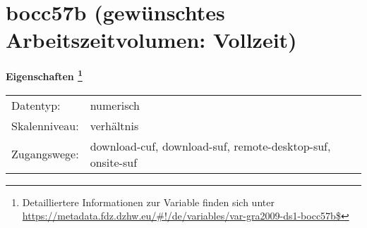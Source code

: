 
    \setcounter{footnote}{0}

    \vspace*{-1.8cm}
	\section{bocc57b (gewünschtes Arbeitszeitvolumen: Vollzeit)}
	\label{section:bocc57b}



    \vspace*{0.5cm}
    \noindent\textbf{Eigenschaften
	\footnote{Detailliertere Informationen zur Variable finden sich unter
		\url{https://metadata.fdz.dzhw.eu/\#!/de/variables/var-gra2009-ds1-bocc57b$}}}\\
	\begin{tabularx}{\hsize}{@{}lX}
	Datentyp: & numerisch \\
	Skalenniveau: & verhältnis \\
	Zugangswege: &
	  download-cuf, 
	  download-suf, 
	  remote-desktop-suf, 
	  onsite-suf
 \\
    \end{tabularx}



